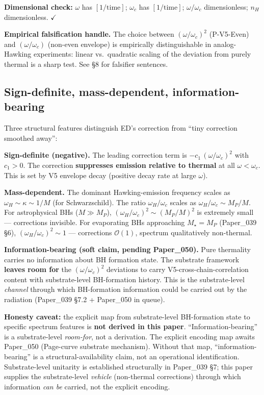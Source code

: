 \documentclass[11pt,a4paper]{article}
\begin{document}
\textbf{Dimensional check:} $\omega$ has $[1/\mathrm{time}]$; $\omega_c$ has $[1/\mathrm{time}]$; $\omega/\omega_c$ dimensionless; $n_H$ dimensionless. $\checkmark$

\textbf{Empirical falsification handle.} The choice between $(\omega/\omega_c)^2$ (P-V5-Even) and $(\omega/\omega_c)$ (non-even envelope) is empirically distinguishable in analog-Hawking experiments: linear vs.\ quadratic scaling of the deviation from purely thermal is a sharp test. See \S8 for falsifier sentences.

\subsection{Sign-definite, mass-dependent, information-bearing}

Three structural features distinguish ED's correction from ``tiny correction smoothed away'':

\textbf{Sign-definite (negative).} The leading correction term is $-c_1\,(\omega/\omega_c)^2$ with $c_1 > 0$. The correction \textbf{suppresses emission relative to thermal} at all $\omega < \omega_c$. This is set by V5 envelope decay (positive decay rate at large $\omega$).

\textbf{Mass-dependent.} The dominant Hawking-emission frequency scales as $\omega_H \sim \kappa \sim 1/M$ (for Schwarzschild). The ratio $\omega_H/\omega_c$ scales as $\omega_H/\omega_c \sim M_P/M$. For astrophysical BHs ($M \gg M_P$), $(\omega_H/\omega_c)^2 \sim (M_P/M)^2$ is extremely small --- corrections invisible. For evaporating BHs approaching $M_\star = M_P$ (Paper\_039 \S6), $(\omega_H/\omega_c)^2 \sim 1$ --- corrections $\mathcal{O}(1)$, spectrum qualitatively non-thermal.

\textbf{Information-bearing (soft claim, pending Paper\_050).} Pure thermality carries no information about BH formation state. The substrate framework \textbf{leaves room for} the $(\omega/\omega_c)^2$ deviations to carry V5-cross-chain-correlation content with substrate-level BH-formation history. This is the substrate-level \emph{channel} through which BH-formation information could be carried out by the radiation (Paper\_039 \S7.2 + Paper\_050 in queue).

\textbf{Honesty caveat:} the explicit map from substrate-level BH-formation state to specific spectrum features is \textbf{not derived in this paper}. ``Information-bearing'' is a substrate-level \emph{room-for}, not a derivation. The explicit encoding map awaits Paper\_050 (Page-curve substrate mechanism). Without that map, ``information-bearing'' is a structural-availability claim, not an operational identification. Substrate-level unitarity is established structurally in Paper\_039 \S7; this paper supplies the substrate-level \emph{vehicle} (non-thermal corrections) through which information \emph{can be} carried, not the explicit encoding.
\end{document}
